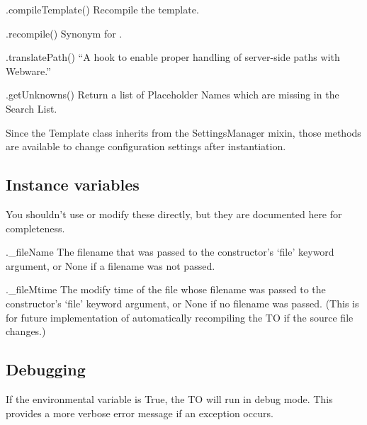 \begin{description}
\item{.compileTemplate()}  Recompile the template.  

\item{.recompile()}  Synonym for .

\item{.translatePath()}  ``A hook to enable proper handling of server-side
     paths with Webware.''
     
\item{.getUnknowns()}  Return a list of Placeholder Names which are missing in
     the Search List.

\end{description}

Since the Template class inherits from the SettingsManager mixin, those methods
are available to change configuration settings after instantiation.




\subsection{Instance variables}

You shouldn't use or modify these directly, but they are documented here for
completeness.

\begin{description}

\item{._fileName}  The filename that was passed to the constructor's `file'
     keyword argument, or None if a filename was not passed.
     
\item{._fileMtime}  The modify time of the file whose filename was passed to
     the constructor's `file' keyword argument, or None if no filename was
     passed.  (This is for future implementation of automatically recompiling
     the TO if the source file changes.)

\end{description}


\subsection{Debugging}

If the environmental variable  is True, the TO will
run in debug mode.  This provides a more verbose error message if an 
exception occurs.


